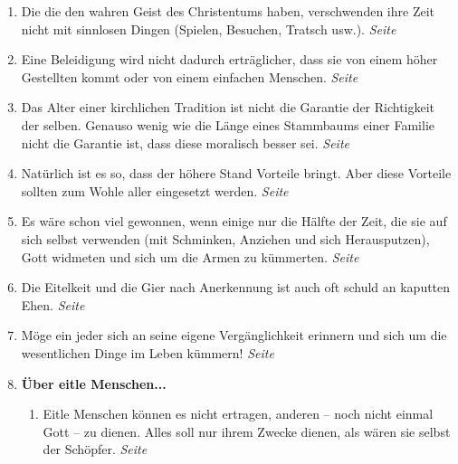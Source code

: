 \begin{enumerate}
 \item Die die den wahren Geist des Christentums haben, verschwenden ihre Zeit
nicht mit sinnlosen Dingen (Spielen, Besuchen, Tratsch usw.).
 \dotfill \textit{Seite~\pageref{ref:10_08_zeitvertreib}}\\

 \item Eine Beleidigung wird nicht dadurch erträglicher, dass sie von einem
höher Gestellten kommt oder von einem einfachen Menschen.
 \dotfill \textit{Seite~\pageref{ref:11_03_beleidigung}}\\

 \item Das Alter einer kirchlichen Tradition ist nicht die Garantie der
Richtigkeit der selben. Genauso wenig wie die Länge eines Stammbaums einer
Familie nicht die Garantie ist, dass diese moralisch besser sei.
 \dotfill \textit{Seite~\pageref{ref:11_04_abstammung}}\\

 \item Natürlich ist es so, dass der höhere Stand Vorteile bringt. Aber diese
Vorteile sollten zum Wohle aller eingesetzt werden.
 \dotfill \textit{Seite~\pageref{ref:11_07_standesvorteil}}\\

 \item Es wäre schon viel gewonnen, wenn einige nur die Hälfte der Zeit, die sie
auf sich selbst verwenden (mit Schminken, Anziehen und sich Herausputzen), Gott
widmeten und sich um die Armen zu kümmerten.
 \dotfill \textit{Seite~\pageref{ref:11_09_putzsucht}}\\

 \item Die Eitelkeit und die Gier nach Anerkennung ist auch oft schuld an
kaputten Ehen.
 \dotfill \textit{Seite~\pageref{ref:11_09_kaputte_ehen}}\\

 \item Möge ein jeder sich an seine eigene Vergänglichkeit erinnern und sich um
die wesentlichen Dinge im Leben kümmern!
 \dotfill \textit{Seite
\pageref{ref:11_10_juengstes_gericht}}\\

 \item \textbf{Über eitle Menschen...}

\begin{enumerate}
 \item Eitle Menschen können es nicht ertragen, anderen -- noch nicht einmal Gott --
zu dienen. Alles soll nur ihrem Zwecke dienen, als wären sie selbst der
Schöpfer.
 \dotfill \textit{Seite~\pageref{ref:12_01_egoisten}}\\


\end{enumerate}
\end{enumerate}

